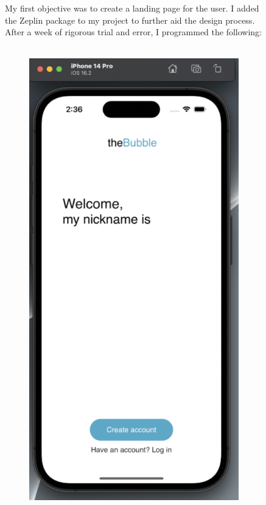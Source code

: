 \documentclass[a4paper, 11pt]{report}
\begin{document}
\begin{figure}
My first objective was to create a landing page for the user. I added the Zeplin package to my project to further aid the design process. After a week of rigorous trial and error, I programmed the following:
\\
\\
  \begin{subfigure}[h]{0.5\textwidth}
    \includegraphics[width=\textwidth]{1.png}

\end{subfigure}
\end{figure}
\end{document}
